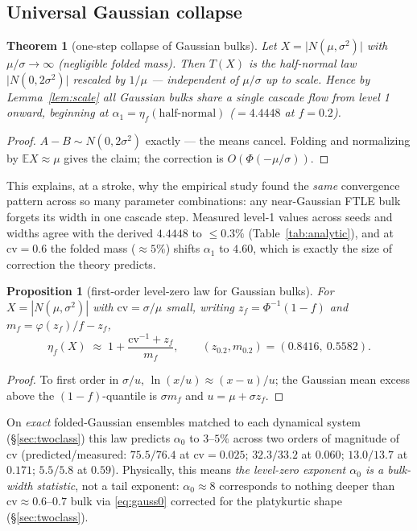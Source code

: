 \documentclass[11pt,a4paper]{article}
\newtheorem{theorem}{Theorem}
\newtheorem{proposition}{Proposition}
\theoremstyle{remark}
\newcommand{\cv}{\mathrm{cv}}
\begin{document}
\subsection{Universal Gaussian collapse}

\begin{theorem}[one-step collapse of Gaussian bulks]\label{thm:gauss}
Let $X = \lvert N(\mu,\sigma^2)\rvert$ with $\mu/\sigma \to \infty$ (negligible folded mass). Then
$T(X)$ is the half-normal law $\lvert N(0, 2\sigma^2)\rvert$ rescaled by $1/\mu$ --- \emph{independent
of $\mu/\sigma$ up to scale}. Hence by Lemma~\ref{lem:scale} all Gaussian bulks share a single
cascade flow from level 1 onward, beginning at $\alpha_1 = \eta_f(\text{half-normal})$
($=4.4448$ at $f = 0.2$).
\end{theorem}

\begin{proof}
$A - B \sim N(0, 2\sigma^2)$ exactly --- the means cancel. Folding and normalizing by
$\mathbb{E}X \approx \mu$ gives the claim; the correction is $O(\Phi(-\mu/\sigma))$.
\end{proof}

This explains, at a stroke, why the empirical study found the \emph{same} convergence pattern across
so many parameter combinations: any near-Gaussian FTLE bulk forgets its width in one cascade step.
Measured level-1 values across seeds and widths agree with the derived $4.4448$ to $\le0.3\%$
(Table~\ref{tab:analytic}), and at $\cv = 0.6$ the folded mass ($\approx 5\%$) shifts $\alpha_1$ to
$4.60$, which is exactly the size of correction the theory predicts.

\begin{proposition}[first-order level-zero law for Gaussian bulks]\label{prop:gauss0}
For $X = |N(\mu,\sigma^2)|$ with $\cv = \sigma/\mu$ small, writing $z_f = \Phi^{-1}(1-f)$ and
$m_f = \varphi(z_f)/f - z_f$,
\begin{equation}\label{eq:gauss0}
\eta_f(X) \;\approx\; 1 + \frac{\cv^{-1} + z_f}{m_f},
\qquad (z_{0.2}, m_{0.2}) = (0.8416,\ 0.5582).
\end{equation}
\end{proposition}

\begin{proof}
To first order in $\sigma/u$, $\ln(x/u) \approx (x-u)/u$; the Gaussian mean excess above the
$(1-f)$-quantile is $\sigma m_f$ and $u = \mu + \sigma z_f$.
\end{proof}

On \emph{exact} folded-Gaussian ensembles matched to each dynamical system (\S\ref{sec:twoclass})
this law predicts $\alpha_0$ to $3$--$5\%$ across two orders of magnitude of $\cv$ (predicted/measured:
$75.5/76.4$ at $\cv=0.025$; $32.3/33.2$ at $0.060$; $13.0/13.7$ at $0.171$; $5.5/5.8$ at $0.59$).
Physically, this means \emph{the level-zero exponent $\alpha_0$ is a bulk-width statistic}, not a tail
exponent: $\alpha_0 \approx 8$ corresponds to nothing deeper than $\cv \approx 0.6$--$0.7$ bulk via
\eqref{eq:gauss0} corrected for the platykurtic shape (\S\ref{sec:twoclass}).
\end{document}
